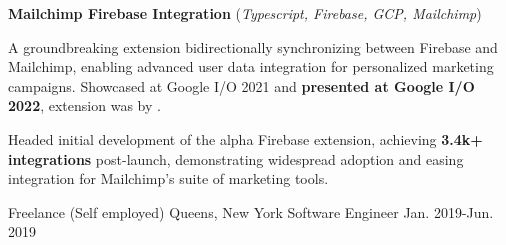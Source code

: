 \begin{cventries}
  \cvcustombodydescription
      {\textbf{Mailchimp Firebase Integration} (\emph{Typescript, Firebase, GCP, Mailchimp})}
      {
      \begin{cvtightprose} %
        {A groundbreaking extension bidirectionally synchronizing between Firebase and Mailchimp, enabling advanced user data integration for personalized marketing campaigns. Showcased at Google I/O 2021 and \textbf{presented at Google I/O 2022}, extension was  by .}
      \end{cvtightprose}
      }
      {
      \begin{cvitems} %
        \item {Headed initial development of the alpha Firebase extension, achieving \textbf{3.4k+ integrations} post-launch, demonstrating widespread adoption and easing integration for Mailchimp’s suite of marketing tools.}
      \end{cvitems}
    }

  \nrolecventrynoitems
    {Freelance (Self employed)} %
    {Queens, New York} %
    {Software Engineer} %
    {Jan. 2019-Jun. 2019} %
    {} %
    {} %
    {} %
    {} %


\end{cventries}
